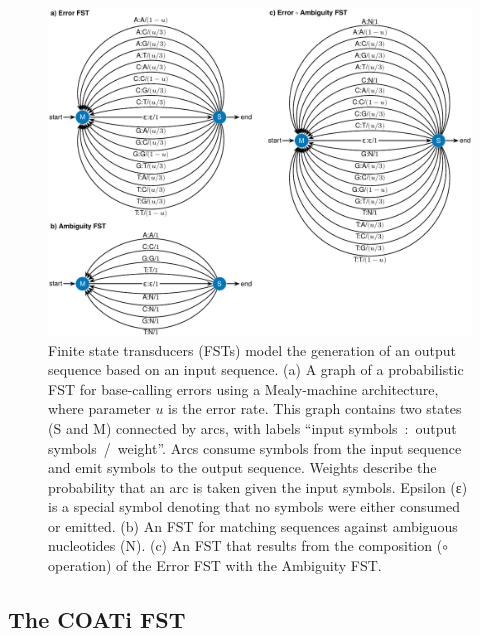 \documentclass[12pt,letterpaper]{article}
\begin{document}
\begin{figure}[!ht]
    \centering
    \includegraphics[width=\textwidth]{figures/fig-fst-base-calling-new.pdf}
    \caption[FSTs more the generation of sequences]{%
    Finite state transducers (FSTs) model the generation of an output sequence based on an input sequence.
    (a) A graph of a probabilistic FST \citep{cotterell-etal-2014-stochastic} for base-calling errors using a Mealy-machine architecture, where parameter $u$ is the error rate. This graph contains two states (S and M) connected by arcs, with labels ``input symbols~:~output symbols~/~weight''. Arcs consume symbols from the input sequence and emit symbols to the output sequence. Weights describe the probability that an arc is taken given the input symbols. Epsilon (ε) is a special symbol denoting that no symbols were either consumed or emitted.
    (b) An FST for matching sequences against ambiguous nucleotides (N). 
    (c) An FST that results from the composition ($∘$ operation) of the Error FST with the Ambiguity FST.
    }\label{fig:base-calling}
\end{figure}

\subsection*{The COATi FST}
\end{document}
